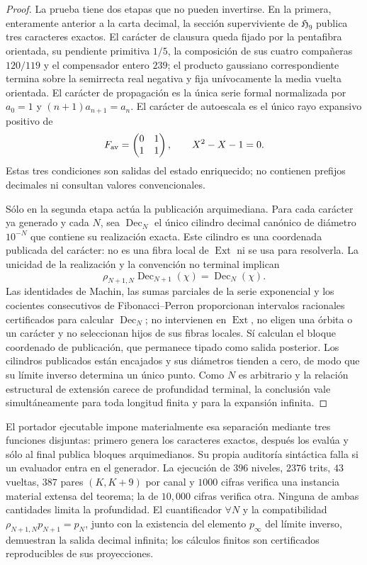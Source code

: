 \begin{proof}
La prueba tiene dos etapas que no pueden invertirse. En la primera, enteramente
anterior a la carta decimal, la sección superviviente de
\(\mathfrak H_9\) publica tres caracteres exactos. El carácter de clausura
queda fijado por la pentafibra orientada, su pendiente primitiva \(1/5\), la
composición de sus cuatro compañeras \(120/119\) y el compensador entero
\(239\); el producto gaussiano correspondiente termina sobre la semirrecta
real negativa y fija unívocamente la media vuelta orientada. El carácter de
propagación es la única serie formal normalizada por
\(a_0=1\) y \((n+1)a_{n+1}=a_n\). El carácter de autoescala es el único rayo
expansivo positivo de
\[
 F_{\rm av}=\begin{pmatrix}0&1\\1&1\end{pmatrix},
 \qquad X^2-X-1=0.
\]
Estas tres condiciones son salidas del estado enriquecido; no contienen
prefijos decimales ni consultan valores convencionales.

Sólo en la segunda etapa actúa la publicación arquimediana. Para cada carácter
ya generado y cada \(N\), sea \(\operatorname{Dec}_N\) el único cilindro
decimal canónico de diámetro \(10^{-N}\) que contiene su realización exacta.
Este cilindro es una coordenada publicada del carácter: no es una fibra local
de \(\operatorname{Ext}\) ni se usa para resolverla.
La unicidad de la realización y la convención no terminal implican
\[
 \rho_{N+1,N}\operatorname{Dec}_{N+1}(\chi)
 =\operatorname{Dec}_N(\chi).
\]
Las identidades de Machin, las sumas parciales de la serie exponencial y los
cocientes consecutivos de Fibonacci--Perron proporcionan intervalos racionales
certificados para calcular \(\operatorname{Dec}_N\); no intervienen en
\(\operatorname{Ext}\), no eligen una órbita o un carácter y no seleccionan
hijos de sus fibras locales. Sí calculan el bloque coordenado de publicación,
que permanece tipado como salida posterior. Los
cilindros publicados están encajados y sus diámetros tienden a cero, de modo
que su límite inverso determina un único punto. Como \(N\) es arbitrario y
la relación estructural de extensión carece de profundidad terminal, la
conclusión vale simultáneamente para toda longitud finita y para la expansión
infinita.
\end{proof}

El portador ejecutable impone materialmente esa separación mediante tres
funciones disjuntas: primero genera los caracteres exactos, después los evalúa
y sólo al final publica bloques arquimedianos. Su propia auditoría sintáctica
falla si un evaluador entra en el generador. La ejecución de \(396\) niveles,
\(2376\) trits, \(43\) vueltas, \(387\) pares \((K,K+9)\) por canal y
\(1000\) cifras verifica una instancia material extensa del teorema; la de
\(10,000\) cifras verifica otra. Ninguna de ambas cantidades limita la
profundidad. El cuantificador \(\forall N\) y la compatibilidad
\(\rho_{N+1,N}p_{N+1}=p_N\), junto con la existencia del elemento
\(p_\infty\) del límite inverso, demuestran la salida decimal infinita; los
cálculos finitos son certificados reproducibles de sus proyecciones.

